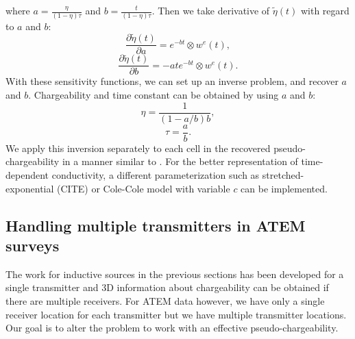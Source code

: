 \documentclass[a4paper, 11pt]{article}
\newcommand{\peta}{\tilde{\eta}}
\begin{document}
where $a = \frac{\eta}{(1-\eta)\tau}$ and $b = \frac{t}{(1-\eta)\tau}$. 
Then we take derivative of $\peta(t)$ with regard to $a$ and $b$:
\begin{equation}
  \frac{\partial \peta(t)}{\partial a} = e^{-bt} \otimes w^e(t),
\end{equation}
\begin{equation}
  \frac{\partial \peta(t)}{\partial b} = -ate^{-bt} \otimes w^e(t).
\end{equation}
With these sensitivity functions, we can set up an inverse problem, and recover $a$ and $b$. 
Chargeability and time constant can be obtained by using $a$ and $b$:
\begin{equation}
  \eta =  \frac{1}{(1-a/b)b},
\end{equation}
\begin{equation}
  \tau =  \frac{a}{b}.
\end{equation}
We apply this inversion separately to each cell in the recovered pseudo-chargeability  in a manner similar to \cite[]{Yuval1997}.
For the better representation of time-dependent conductivity, a different parameterization such as stretched-exponential (CITE) or Cole-Cole model with variable $c$ can be implemented. 

\subsection{Handling multiple transmitters in ATEM surveys}
\label{subsection: Handling multiple transmitters in ATEM surveys}
The work for inductive sources in the previous sections has been developed for a single transmitter and  3D information about chargeability can be obtained if there are multiple receivers. For ATEM data however, we have only a single receiver location for each transmitter but we have multiple transmitter locations. 
Our goal is to alter the problem to work with an effective pseudo-chargeability. 
\end{document}
